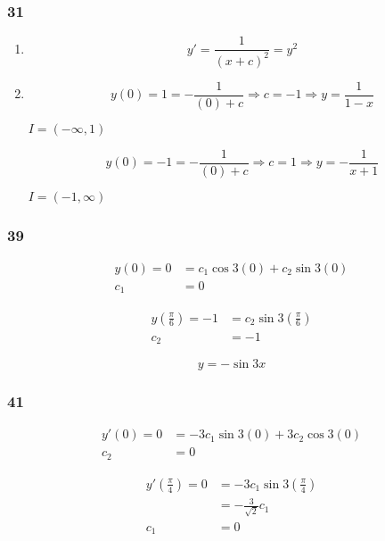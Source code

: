 \documentclass{article}
\begin{document}
\subsubsection{31}

\begin{enumerate}
  \item \[y' = \frac{1}{(x + c)^2} = y^2\]

  \item

        \[y(0) = 1 = -\frac{1}{(0) + c} \Rightarrow c = -1 \Rightarrow y = \frac{1}{1 - x}\]

        $I = (-\infty, 1)$

        \[y(0) = -1 = -\frac{1}{(0) + c} \Rightarrow c = 1 \Rightarrow y = -\frac{1}{x + 1}\]

        $I = (-1, \infty)$
\end{enumerate}

\subsubsection{39}

\begin{align*}
  y(0) = 0 & = c_1 \cos 3 (0) + c_2 \sin 3 (0) \\
  c_1      & = 0
\end{align*}

\begin{align*}
  y \left( \frac{\pi}{6} \right) = -1 & = c_2 \sin 3 \left( \frac{\pi}{6} \right) \\
  c_2                                 & = -1
\end{align*}

\[y = -\sin 3 x\]

\subsubsection{41}

\begin{align*}
  y'(0) = 0 & = -3 c_1 \sin 3 (0) + 3 c_2 \cos 3 (0) \\
  c_2       & = 0
\end{align*}

\begin{align*}
  y' \left( \frac{\pi}{4} \right) = 0 & = -3 c_1 \sin 3 \left( \frac{\pi}{4} \right) \\
                                      & = -\frac{3}{\sqrt{2}} c_1                    \\
  c_1                                 & = 0
\end{align*}
\end{document}
